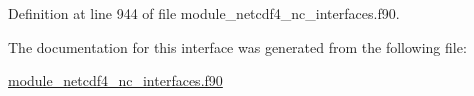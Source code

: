 Definition at line 944 of file module\+\_\+netcdf4\+\_\+nc\+\_\+interfaces.\+f90.



The documentation for this interface was generated from the following file\+:\begin{DoxyCompactItemize}
\item 
\hyperlink{module__netcdf4__nc__interfaces_8f90}{module\+\_\+netcdf4\+\_\+nc\+\_\+interfaces.\+f90}\end{DoxyCompactItemize}
